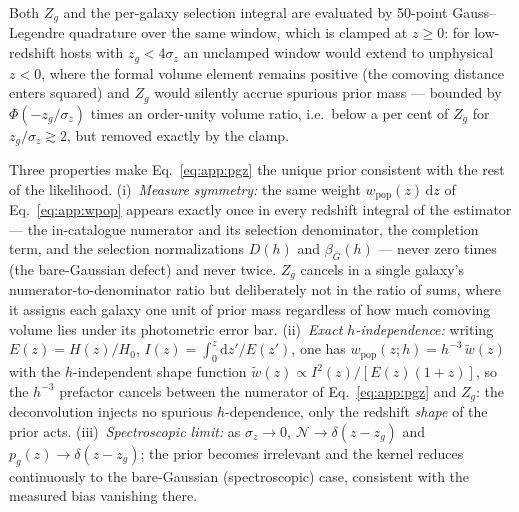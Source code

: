 Both $Z_g$ and the per-galaxy selection integral are evaluated by 50-point
Gauss--Legendre quadrature over the same window,
which is clamped at $z \ge 0$: for low-redshift hosts with $z_g < 4\sigma_z$
an unclamped window would extend to unphysical $z<0$, where the formal volume
element remains positive (the comoving distance enters squared) and $Z_g$
would silently accrue spurious prior mass --- bounded by
$\Phi(-z_g/\sigma_z)$ times an order-unity volume ratio, i.e.\ below a per
cent of $Z_g$ for $z_g/\sigma_z \gtrsim 2$, but removed exactly by the clamp.

Three properties make Eq.~\eqref{eq:app:pgz} the unique prior consistent with
the rest of the likelihood. (i)~\emph{Measure symmetry:} the same weight
$w_\mathrm{pop}(z)\,\mathrm{d}z$ of Eq.~\eqref{eq:app:wpop} appears exactly once in every redshift integral
of the estimator --- the in-catalogue numerator and its selection
denominator, the completion term, and the selection normalizations $D(h)$
and $\beta_{\bar G}(h)$ --- never zero times (the bare-Gaussian defect) and
never twice. $Z_g$ cancels in a single galaxy's numerator-to-denominator
ratio but deliberately not in the ratio of sums, where it assigns each galaxy
one unit of prior mass regardless of how much comoving volume lies under its
photometric error bar.
(ii)~\emph{Exact $h$-independence:} writing $E(z) = H(z)/H_0$,
$I(z) = \int_0^z \mathrm{d}z'/E(z')$, one has
$w_\mathrm{pop}(z; h) = h^{-3}\, \tilde{w}(z)$ with the
$h$-independent shape function
$\tilde{w}(z) \propto I^2(z)/[E(z)(1+z)]$, so the $h^{-3}$ prefactor cancels between
the numerator of Eq.~\eqref{eq:app:pgz} and $Z_g$: the deconvolution injects
no spurious $h$-dependence, only the redshift \emph{shape} of the prior acts.
(iii)~\emph{Spectroscopic limit:} as $\sigma_z \to 0$,
$\mathcal{N} \to \delta(z - z_g)$ and $p_g(z) \to \delta(z - z_g)$; the prior
becomes irrelevant and the kernel reduces continuously to the bare-Gaussian
(spectroscopic) case, consistent with the measured bias vanishing there.

